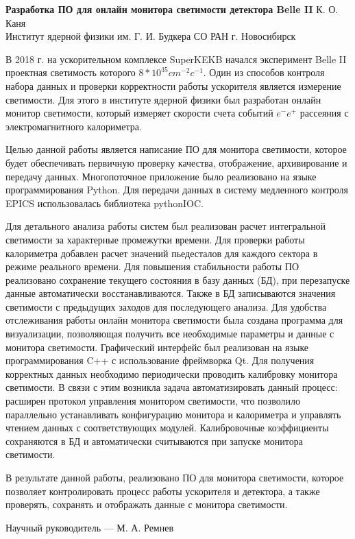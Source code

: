\documentclass[12pt,a4paper]{scrartcl}
\begin{document}
    \begin{center}
        \textbf{Разработка ПО для онлайн монитора светимости детектора Belle II}
        \bigbreak
        К. О. Каня \\
        Институт ядерной физики им. Г. И. Будкера СО РАН г. Новосибирск
    \end{center}

    В 2018 г. на ускорительном комплексе SuperKEKB начался эксперимент Belle II проектная светимость которого $8 * 10^{35} cm^{-2} c^{-1}$. Один из способов контроля набора данных и проверки корректности работы ускорителя является измерение светимости. Для этого в институте ядерной физики был разработан онлайн монитор светимости, который измеряет скорости счета событий $e^-e^+$ рассеяния с электромагнитного калориметра. \par
    Целью данной работы является написание ПО для монитора светимости, которое будет обеспечивать первичную проверку качества, отображение, архивирование и передачу данных. Многопоточное приложение было реализовано на языке программирования Python. Для передачи данных в систему медленного контроля EPICS использовалась библиотека pythonIOC. \par
Для детального анализа работы систем был реализован расчет интегральной светимости за характерные промежутки времени. Для проверки работы калориметра добавлен расчет значений пьедесталов для каждого сектора в режиме реального времени. Для повышения стабильности работы ПО реализовано сохранение текущего состояния в базу данных (БД), при перезапуске данные автоматически восстанавливаются. Также в БД записываются значения светимости с предыдущих заходов для последующего анализа. Для удобства отслеживания работы онлайн монитора светимости была создана программа для визуализации, позволяющая получить все необходимые параметры и данные с монитора светимости. Графический интерфейс был реализован на языке программирования C++ с использование фреймворка Qt. Для получения корректных данных необходимо периодически проводить калибровку монитора светимости. В связи с этим возникла задача автоматизировать данный процесс: расширен протокол управления монитором светимости, что позволило параллельно устанавливать конфигурацию монитора и калориметра и управлять чтением данных с соответствующих модулей. Калибровочные коэффициенты сохраняются в БД и автоматически считываются при запуске монитора светимости. \par
В результате данной работы, реализовано ПО для монитора светимости, которое позволяет контролировать процесс работы ускорителя и детектора, а также проверять, сохранять и отображать данные с монитора светимости. 
\bigbreak
\begin{center}
    Научный руководитель --- М. А. Ремнев
\end{center} 
\end{document}
